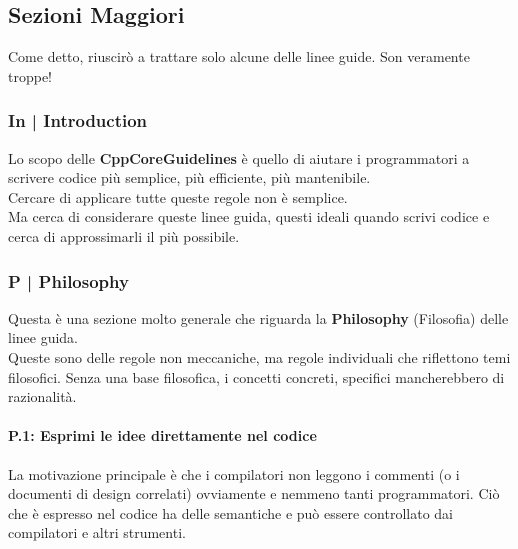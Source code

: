 \subsection{Sezioni Maggiori}


\textsf{\small Come detto, riuscirò a trattare solo alcune delle linee guide. Son veramente troppe!} \break


\subsubsection{In | Introduction}

\textsf{\small Lo scopo delle \textbf{CppCoreGuidelines} è quello di aiutare i programmatori a scrivere codice più semplice, più efficiente, più mantenibile.} \\

\textsf{\small Cercare di applicare tutte queste regole non è semplice.} \\

\textsf{\small Ma cerca di considerare queste linee guida, questi ideali quando scrivi codice e cerca di approssimarli il più possibile.} \break


\subsubsection{P | Philosophy}

\textsf{\small Questa è una sezione molto generale che riguarda la \textbf{Philosophy} (Filosofia) delle linee guida.} \\

\textsf{\small Queste sono delle regole non meccaniche, ma regole individuali che riflettono temi filosofici. Senza una base filosofica, i concetti concreti, specifici mancherebbero di razionalità.}

\paragraph{P.1: Esprimi le idee direttamente nel codice}

\textsf{\small La motivazione principale è che i compilatori non leggono i commenti (o i documenti di design correlati) ovviamente e nemmeno tanti programmatori. Ciò che è espresso nel codice ha delle semantiche e può essere controllato dai compilatori e altri strumenti.} \\

